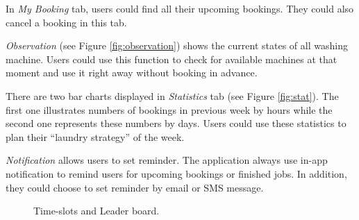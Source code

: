 In \emph{My Booking} tab, users could find all their upcoming bookings. They could also cancel a booking in this tab.

 \emph{Observation} (see Figure \ref{fig:observation}) shows the current states of all washing machine. Users could use this function to check for available machines at that moment and use it right away without booking in advance.

There are two bar charts displayed in \emph{Statistics} tab (see Figure \ref{fig:stat}). The first one illustrates numbers of bookings in previous week by hours while the second one represents these numbers by days. Users could use these statistics to plan their ``laundry strategy'' of the week.

\emph{Notification} allows users to set reminder. The application always use in-app notification to remind users for upcoming bookings or finished jobs. In addition, they could choose to set reminder by email or SMS message.
\begin{figure}[h]%
    \centering
		\caption{Time-slots and Leader board.}%
    \label{fig:figure5}
\end{figure}

